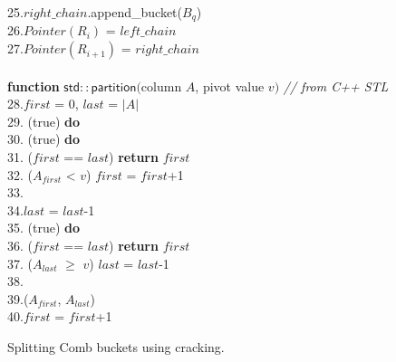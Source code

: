 \begin{figure}[t]
\begin{minipage}{4in}
{\begin{tabbing}
25.\>\>$right\_chain$.append\_bucket($B_{q}$)\\
26.\>$Pointer(R_i)$ = $left\_chain$\\
27.\>$Pointer(R_{i+1})$ = $right\_chain$\\
\\
{\bf function} $\mathsf{std::partition}($column $A$, pivot value $v)$ {\it // from C++ STL}\\
28.\>$first$ = $0$, $last$ = $|A|$\\
29. (true) {\bf do}\\
30.\> (true) {\bf do}\\
31.\>\> ($first$ == $last$) {\bf return} $first$\\
32.\>\> ($A_{first}$ < $v$) $first$ = $first$+1\\
33.\>\>\\
34.\>\>$last$ = $last$-1\\
35.\> (true) {\bf do}\\
36.\>\> ($first$ == $last$) {\bf return} $first$\\
37.\>\> ($A_{last}$ $\ge$ $v$) $last$ = $last$-1\\
38.\>\>\\
39.\>($A_{first}$, $A_{last}$)\\
40.\>\>$first$ = $first$+1\\
\end{tabbing}
}
\end{minipage}
\vspace{-1em}
\caption{Splitting Comb buckets using cracking.}\label{algo:crack}
\vspace{-1.5em}
\end{figure}



